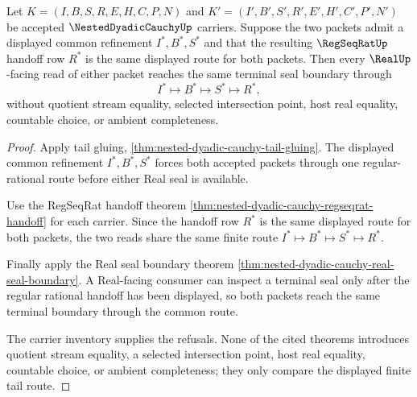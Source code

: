 \begin{theorem}
\label{thm:nested-dyadic-cauchy-common-tail-uniqueness}
Let $K=(I,B,S,R,E,H,C,P,N)$ and $K'=(I',B',S',R',E',H',C',P',N')$ be accepted $\NestedDyadicCauchyUp$ carriers. Suppose the two packets admit a displayed common refinement $I^*,B^*,S^*$ and that the resulting $\RegSeqRatUp$ handoff row $R^*$ is the same displayed route for both packets. Then every $\RealUp$-facing read of either packet reaches the same terminal seal boundary through
$$
I^*\longmapsto B^*\longmapsto S^*\longmapsto R^*,
$$
without quotient stream equality, selected intersection point, host real equality, countable choice, or ambient completeness.
\end{theorem}
\begin{proof}
Apply tail gluing, \autoref{thm:nested-dyadic-cauchy-tail-gluing}. The displayed common refinement $I^*,B^*,S^*$ forces both accepted packets through one regular-rational route before either Real seal is available.

Use the RegSeqRat handoff theorem \autoref{thm:nested-dyadic-cauchy-regseqrat-handoff} for each carrier. Since the handoff row $R^*$ is the same displayed route for both packets, the two reads share the same finite route $I^*\mapsto B^*\mapsto S^*\mapsto R^*$.

Finally apply the Real seal boundary theorem \autoref{thm:nested-dyadic-cauchy-real-seal-boundary}. A Real-facing consumer can inspect a terminal seal only after the regular rational handoff has been displayed, so both packets reach the same terminal boundary through the common route.

The carrier inventory supplies the refusals. None of the cited theorems introduces quotient stream equality, a selected intersection point, host real equality, countable choice, or ambient completeness; they only compare the displayed finite tail route.
\end{proof}

